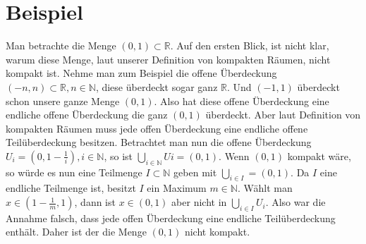 \section{Beispiel}
Man betrachte die Menge \( (0,1) \subset \mathbb{R} \). Auf den ersten Blick, ist nicht klar, warum diese Menge, laut unserer Definition von kompakten Räumen, nicht kompakt ist. 
Nehme man zum Beispiel die offene Überdeckung \( (-n,n) \subset \mathbb{R} , n \in \mathbb{N} \), diese überdeckt sogar ganz \(  \mathbb{R} \). 
Und \( (-1,1)  \) überdeckt schon unsere ganze Menge \( (0,1)  \). Also hat diese offene Überdeckung eine endliche offene Überdeckung die ganz \( (0,1)  \) überdeckt.
Aber laut Definition von kompakten Räumen muss jede offen Überdeckung eine endliche offene Teilüberdeckung besitzen. Betrachtet man nun die offene Überdeckung 
\( U_{i}=(0,1-\frac{1}{i}), i \in \mathbb{N} \), so ist \(\bigcup_{i \in \mathbb{N}} U{i} = (0,1) \). Wenn \( (0,1)  \) kompakt wäre, 
so würde es nun eine Teilmenge \(I \subset \mathbb{N} \) geben mit \(\bigcup_{i \in I} = (0,1) \).
Da \(I\) eine endliche Teilmenge ist, besitzt \(I\) ein Maximum \( m \in \mathbb{N} \). Wählt man \(x \in (1-\frac{1}{m},1) \), dann ist \(x \in (0,1) \) aber nicht in \(\bigcup_{i \in I} U_{i}\). Also war die Annahme falsch, dass jede offen Überdeckung eine endliche Teilüberdeckung enthält. Daher ist der die Menge \((0,1) \) nicht kompakt.
		
